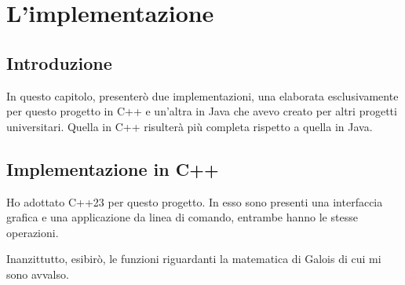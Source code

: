 
\chapter{L'implementazione}






\section{Introduzione}

\textsf{\small In questo capitolo, presenterò due implementazioni, una elaborata esclusivamente per questo progetto in C++ e un'altra in Java che avevo creato per altri progetti universitari. Quella in C++ risulterà più completa rispetto a quella in Java.} %


\section{Implementazione in C++}

\textsf{\small Ho adottato C++23 per questo progetto. In esso sono presenti una interfaccia grafica e una applicazione da linea di comando, entrambe hanno le stesse operazioni.} %

\textsf{\small Inanzittutto, esibirò, le funzioni riguardanti la matematica di Galois di cui mi sono avvalso.}

